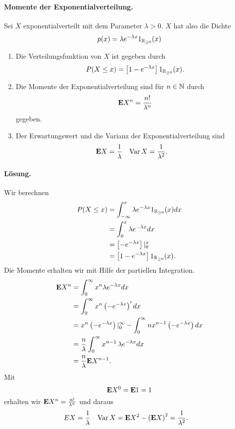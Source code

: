 \paragraph{Momente der Exponentialverteilung.} 
Sei $X$ exponentialverteilt mit dem Parameter $\lambda>0$. $X$ hat also die Dichte
\begin{equation*}
    p(x) = \lambda e^{-\lambda x } 1_{\mathbb R_{\geq 0}}(x)
\end{equation*}
\begin{enumerate}
    \item Die Verteilungsfunktion von $X$ ist gegeben durch
        \begin{equation*}
            P( X \leq x) = \left[ 1 - e^{-\lambda x} \right] 1_{\mathbb R_{\geq 0}}(x).
        \end{equation*}
    \item Die Momente der Exponentialverteilung sind für $n\in\mathbb N$ durch
        \begin{equation*}
            \mathbf{E} X^n = \frac{n!}{\lambda^{n}}
        \end{equation*}
        gegeben. 
    \item Der Erwartungswert und die Varianz der Exponentialverteilung sind
        \begin{align*}
            \mathbf{E} X    & = \frac{1}{\lambda} & 
            \operatorname{Var} X  & = \frac{1}{\lambda^2}.
        \end{align*}
\end{enumerate}
\paragraph*{Lösung. } 
Wir berechnen
\begin{align*}
    P(X \leq x) & = 
    \int_{-\infty}^{x} \lambda e^{-\lambda x } 1_{\mathbb R_{\geq 0}}(x) dx \\
    &= \int_{0}^{x} \lambda e^{-\lambda x } dx \\
    &= \left[  - e^{-\lambda x}  \right] |_{0}^{x} \\
    &= \left[ 1 - e^{-\lambda x} \right] 1_{\mathbb R_{\geq 0}}(x).
\end{align*}
Die Momente erhalten wir mit Hilfe der partiellen Integration. 
\begin{align*}
    \mathbf{E} X^n &= \int_{0}^{\infty} x^n \lambda e^{- \lambda x} dx \\
    &= \int_{0}^{\infty} x^n\left( -e^{-\lambda x} \right)' dx \\
    &= x^n \left( - e^{-\lambda x} \right)|_{0}^{\infty} 
    - \int_{0}^{\infty} n x^{n-1} \left( -e^{-\lambda x} \right) dx  \\
    &= \frac{n}{\lambda} \int_{0}^{\infty} x^{n-1}\, \lambda e^{-\lambda x} dx \\
    & = \frac{n}{\lambda} \mathbf{E} X^{n-1}.
\end{align*}
Mit
\begin{equation*}
    \mathbf{E} X^{0} = \mathbf{E} 1 = 1
\end{equation*}
erhalten wir $\mathbf{E} X^n = \frac{n!}{\lambda^n}$ und daraus 
\begin{align*}
    E X &= \frac{1}{\lambda} &   \operatorname{Var} X &= \mathbf{E} X^2 - \left( \mathbf{E} X \right)^2 = 
    \frac{1}{\lambda^2}. 
\end{align*}


